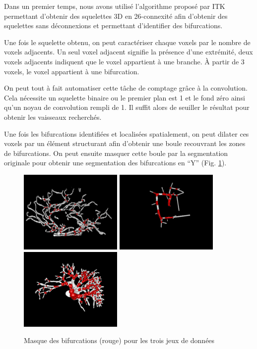 Dans un premier temps, nous avons utilisé l'algorithme proposé par ITK permettant d'obtenir des squelettes 3D \cite{Homann2007_implementation_thinning} en 26-connexité afin d'obtenir des squelettes sans déconnexions et permettant d'identifier des bifurcations. 

Une fois le squelette obtenu, on peut caractériser chaque voxels par le nombre de voxels adjacents. Un seul voxel adjacent signifie la présence d'une extrémité, deux voxels adjacents indiquent que le voxel appartient à une branche. À partir de 3 voxels, le voxel appartient à une bifurcation.

On peut tout à fait automatiser cette tâche de comptage grâce à la convolution. Cela nécessite un squelette binaire ou le premier plan est 1 et le  fond zéro ainsi qu'un noyau de convolution rempli de 1. Il suffit alors de seuiller le résultat pour obtenir les vaisseaux recherchés.

Une fois les bifurcations identifiées et localisées spatialement, on peut dilater ces voxels par un élément structurant afin d'obtenir une boule recouvrant les zones de bifurcations. On peut ensuite masquer cette boule par la segmentation originale pour obtenir une segmentation des bifurcations en ``Y'' (Fig. \ref{fig:bifurcations_masks}).

\begin{figure}[!ht]
  \centering
  \includegraphics[height=4cm]{Images/bifurcations_bullitt.png}
  \includegraphics[height=4cm]{Images/bifurcations_vascu.png}
  \includegraphics[height=4cm]{Images/bifurcations_ircad.png}
  \caption{Masque des bifurcations (rouge) pour les trois jeux de données}
  \label{fig:bifurcations_masks}
\end{figure}

